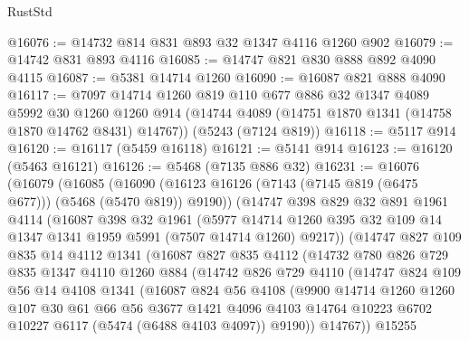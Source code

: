 \begin{lexlean}{RustStd}
\begin{coremodule}
@16076 := @14732 @814 @831 @893 @32 @1347 @4116 @1260 @902
@16079 := @14742 @831 @893 @4116
@16085 := @14747 @821 @830 @888 @892 @4090 @4115
@16087 := @5381 @14714 @1260
@16090 := @16087 @821 @888 @4090
@16117 := @7097
    @14714
    @1260
    @819
    @110
    @677
    @886
    @32
    @1347
    @4089
    @5992
    @30
    @1260
    @1260
    @914
    (@14744 @4089 (@14751 @1870 @1341 (@14758 @1870 @14762 @8431) @14767))
    (@5243 (@7124 @819))
@16118 := @5117 @914
@16120 := @16117 (@5459 @16118)
@16121 := @5141 @914
@16123 := @16120 (@5463 @16121)
@16126 := @5468 (@7135 @886 @32)
@16231 := @16076
    (@16079
      (@16085
        (@16090 (@16123 @16126 (@7143 (@7145 @819 (@6475 @677))) (@5468 (@5470 @819)) @9190))
        (@14747
          @398
          @829
          @32
          @891
          @1961
          @4114
          (@16087
            @398
            @32
            @1961
            (@5977
              @14714
              @1260
              @395
              @32
              @109
              @14
              @1347
              @1341
              @1959
              @5991
              (@7507 @14714 @1260)
              @9217))
          (@14747
            @827
            @109
            @835
            @14
            @4112
            @1341
            (@16087
              @827
              @835
              @4112
              (@14732
                @780
                @826
                @729
                @835
                @1347
                @4110
                @1260
                @884
                (@14742
                  @826
                  @729
                  @4110
                  (@14747
                    @824
                    @109
                    @56
                    @14
                    @4108
                    @1341
                    (@16087
                      @824
                      @56
                      @4108
                      (@9900
                        @14714
                        @1260
                        @1260
                        @107
                        @30
                        @61
                        @66
                        @56
                        @3677
                        @1421
                        @4096
                        @4103
                        @14764
                        @10223
                        @6702
                        @10227
                        @6117
                        (@5474 (@6488 @4103 @4097))
                        @9190))
                    @14767))
                @15255

\end{coremodule}
\end{lexlean}
